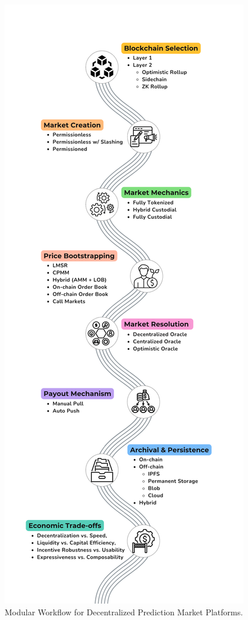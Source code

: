 {\begin{figure}[htbp]
    \centering
    \includegraphics[height=1\textheight]{figures/fig_modular_workflow.png}
    \caption{Modular Workflow for Decentralized Prediction Market Platforms.}
    \label{fig:dpm_workflow}
\end{figure}

}
